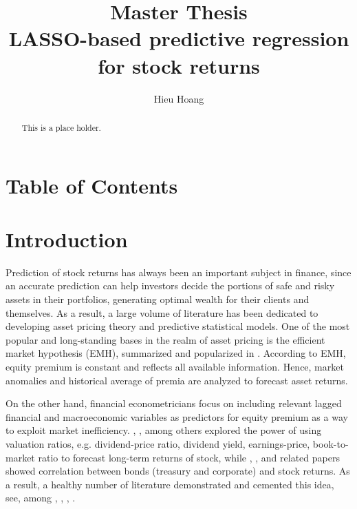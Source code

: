 \documentclass[12pt,a4paper]{article}
\author{Hieu Hoang}
\title{Master Thesis \\ LASSO-based predictive regression for stock returns}
\begin{document}
\begin{titlepage}
	\maketitle
	\begin{abstract}
		This is a place holder.
	\end{abstract}
\end{titlepage}

\section*{Table of Contents}
\tableofcontents
\newpage

\section{Introduction}
Prediction of stock returns has always been an important subject in finance, since an accurate prediction can help investors decide the portions of safe and risky assets in their portfolios, generating optimal wealth for their clients and themselves. As a result, a large volume of literature has been dedicated to developing asset pricing theory and predictive statistical models. One of the most popular and long-standing bases in the realm of asset pricing is the efficient market hypothesis (EMH), summarized and popularized in \cite{fama1970efficient}. According to EMH, equity premium is constant and reflects all available information. Hence, market anomalies and historical average of premia are analyzed to forecast asset returns.

On the other hand, financial econometricians focus on including relevant lagged financial and macroeconomic variables as predictors for equity premium as a way to exploit market inefficiency. \cite{fama1988dividend}, \cite{schiller1998valuation}, among others explored the power of using valuation ratios, e.g. dividend-price ratio, dividend yield, earnings-price, book-to-market ratio to forecast long-term returns of stock, while \cite{fama1990stock}, \cite{schwert1990stock}, and related papers showed correlation between bonds (treasury and corporate) and stock returns. As a result, a healthy number of literature demonstrated and cemented this idea, see, among \cite{hodrick1992dividend}, \cite{kothari1997book}, \cite{lamont1998earnings}, 
\cite{pontiff1998book}.
\end{document}
